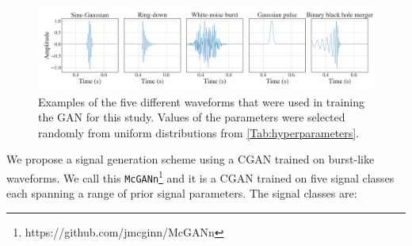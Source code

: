 \documentclass[12pt]{iopart}
\begin{document}
%
\begin{figure}
    \centering
    \includegraphics[width=\textwidth]{figures/training-sample.png}
    \caption{Examples of the five different waveforms that were used in training the \ac{GAN} for this study. Values of the parameters were selected randomly from uniform distributions from \cref{Tab:hyperparameters}.}
    \label{fig:training_waveforms}
\end{figure}
%
We propose a signal generation scheme using a \ac{CGAN} trained on burst-like
waveforms. We call this \texttt{McGANn}\footnote{https://github.com/jmcginn/McGANn} and it is a \ac{CGAN} trained on five signal classes each spanning a range
of prior signal parameters. The signal classes are:
\end{document}
